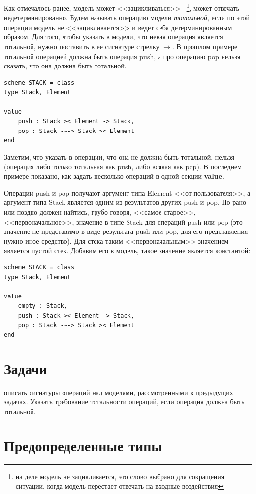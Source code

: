 \documentclass[14pt, twoside]{extreport}
\begin{document}
Как отмечалось ранее, модель может <<зацикливаться>> ~\footnote{на деле модель не зацикливается, это слово выбрано для сокращения ситуации, когда модель перестает отвечать на входные воздействия}, может отвечать недетерминированно. Будем называть операцию модели  \emph{тотальной}, если по этой операции модель не <<зацикливается>> и ведет себя детерминированным образом. Для того, чтобы указать в модели, что некая операция является тотальной, нужно поставить в ее сигнатуре стрелку $\rightarrow$. В прошлом примере тотальной операцией должна быть операция push, а про операцию pop нельзя сказать, что она должна быть тотальной:
\begin{lstlisting}
scheme STACK = class
type Stack, Element

value
	push : Stack >< Element -> Stack,
	pop : Stack -~-> Stack >< Element
end
\end{lstlisting}

Заметим, что указать в операции, что она не должна быть тотальной, нельзя (операция либо только тотальная как push, либо всякая как pop). В последнем примере показано, как задать несколько операций в одной секции \textbf{value}.

Операции push и pop получают аргумент типа Element <<от пользователя>>, а аргумент типа Stack является одним из результатов других push и pop. Но рано или поздно должен найтись, грубо говоря, <<самое старое>>, <<первоначальное>>, значение в типе Stack для операций push или pop (это значение не представимо в виде результата push или pop, для его представления нужно иное средство). Для стека таким <<первоначальным>> значением является пустой стек. Добавим его в модель, такое значение является константой:

\begin{lstlisting}
scheme STACK = class
type Stack, Element

value
	empty : Stack,
	push : Stack >< Element -> Stack,
	pop : Stack -~-> Stack >< Element
end
\end{lstlisting}

\section*{Задачи}

описать сигнатуры операций над моделями, рассмотренными в предыдущих задачах. Указать требование тотальности операций, если операция должна быть тотальной.

\section{Предопределенные типы}
\end{document}
